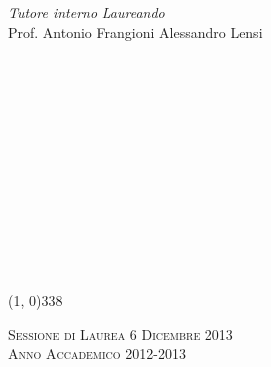 \begin{titlepage}
\begin{center}
\ \\ \ \\
\ \\
\ \\
\ \\
\begin{flushleft}
\begin{large}
\textit{Tutore interno}  \hspace{238pt} \textit{Laureando}
\\ \vspace{5pt} Prof. Antonio Frangioni \hspace{5.5cm} Alessandro Lensi
\end{large}
\end{flushleft}
\ \\
\ \\
\ \\
\ \\
\ \\
\ \\
\ \\
\ \\
\ \\
\ \\
\ \\
\ \\

\line(1, 0){338} \\
\begin{large}
\textsc{Sessione di Laurea 6 Dicembre 2013} \\
\textsc{Anno Accademico 2012-2013}
\end{large}
\end{center}
\end{titlepage}
\clearpage
